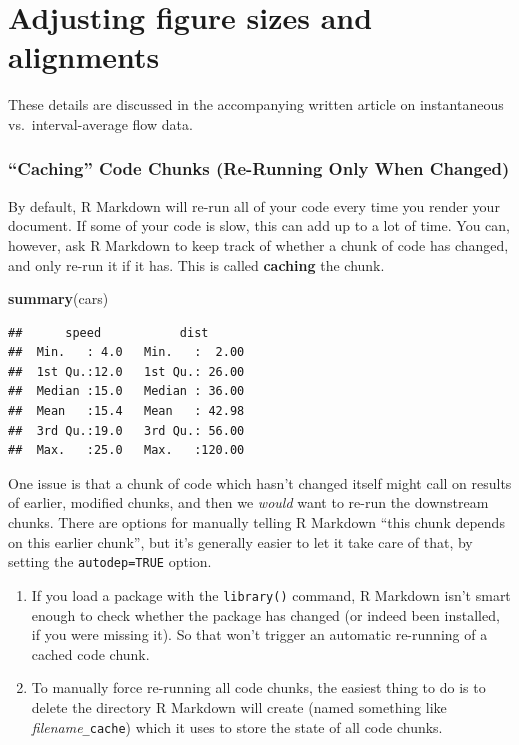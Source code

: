 \documentclass[]{book}
\newenvironment{Shaded}{\begin{snugshade}}{\end{snugshade}}
\newcommand{\KeywordTok}[1]{\textcolor[rgb]{0.13,0.29,0.53}{\textbf{#1}}}
\newcommand{\NormalTok}[1]{#1}
\providecommand{\tightlist}{%
  \setlength{\itemsep}{0pt}\setlength{\parskip}{0pt}}
\theoremstyle{definition}
\theoremstyle{definition}
\theoremstyle{definition}
\theoremstyle{remark}
\begin{document}
\section{Adjusting figure sizes and
alignments}\label{adjusting-figure-sizes-and-alignments}

These details are discussed in the accompanying written article on
instantaneous vs.~interval-average flow data.

\subsubsection{\texorpdfstring{``Caching'' Code Chunks (Re-Running Only
When
Changed)}{Caching Code Chunks (Re-Running Only When Changed)}}\label{caching-code-chunks-re-running-only-when-changed}

By default, R Markdown will re-run all of your code every time you
render your document. If some of your code is slow, this can add up to a
lot of time. You can, however, ask R Markdown to keep track of whether a
chunk of code has changed, and only re-run it if it has. This is called
\textbf{caching} the chunk.

\begin{Shaded}
\begin{Highlighting}[]
\KeywordTok{summary}\NormalTok{(cars)}
\end{Highlighting}
\end{Shaded}

\begin{verbatim}
##      speed           dist       
##  Min.   : 4.0   Min.   :  2.00  
##  1st Qu.:12.0   1st Qu.: 26.00  
##  Median :15.0   Median : 36.00  
##  Mean   :15.4   Mean   : 42.98  
##  3rd Qu.:19.0   3rd Qu.: 56.00  
##  Max.   :25.0   Max.   :120.00
\end{verbatim}

One issue is that a chunk of code which hasn't changed itself might call
on results of earlier, modified chunks, and then we \emph{would} want to
re-run the downstream chunks. There are options for manually telling R
Markdown ``this chunk depends on this earlier chunk'', but it's
generally easier to let it take care of that, by setting the
\texttt{autodep=TRUE} option.

\begin{enumerate}
\def\labelenumi{\arabic{enumi}.}
\tightlist
\item
  If you load a package with the \texttt{library()} command, R Markdown
  isn't smart enough to check whether the package has changed (or indeed
  been installed, if you were missing it). So that won't trigger an
  automatic re-running of a cached code chunk.
\item
  To manually force re-running all code chunks, the easiest thing to do
  is to delete the directory R Markdown will create (named something
  like \emph{filename}\texttt{\_cache}) which it uses to store the state
  of all code chunks.
\end{enumerate}
\end{document}
